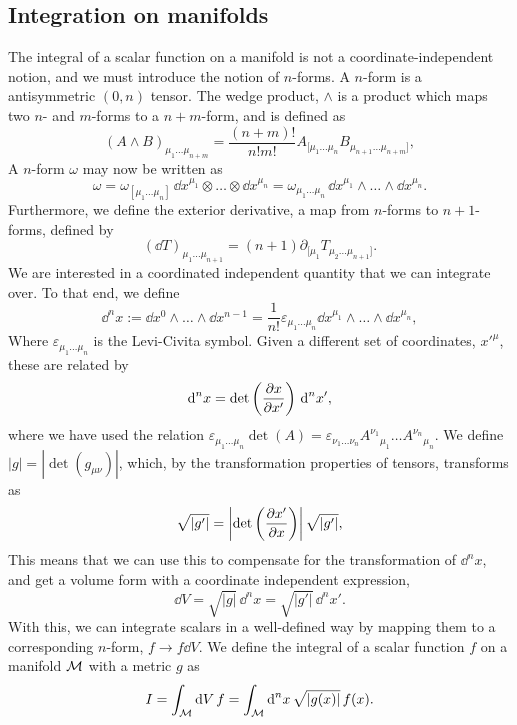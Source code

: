 \subsection{Integration on manifolds}
\label{subsection: integration on manifolds}

The integral of a scalar function on a manifold is not a coordinate-independent notion, and we must introduce the notion of $n$-forms.
A $n$-form is a antisymmetric $(0, n)$ tensor.
The wedge product, $\wedge$ is a product which maps two $n$- and $m$-forms to a $n+m$-form, and is defined as
%
\begin{equation}
    (A\wedge B)_{\mu_1\dots\mu_{n+m}} = \frac{(n + m)!}{n! m!} A_{[\mu_1\dots\mu_n}B_{\mu_{n+1}\dots\mu_{n+m}]},
\end{equation}
%
A $n$-form $\omega$ may now be written as
%
\begin{equation}
    \omega 
    = \omega_{[\mu_1 \dots \mu_n]} \, \dd x^{\mu_1} \otimes \dots \otimes \dd x^{\mu_n}
    = \omega_{\mu_1 \dots \mu_n} \, \dd x^{\mu_1} \wedge \dots \wedge \dd x^{\mu_n}.
\end{equation}
% 
Furthermore, we define the exterior derivative, a map from $n$-forms to $n+1$-forms, defined by
%
\begin{equation}
    (\dd T)_{\mu_1 \dots \mu_{n+1}} = (n+1) \partial_{[\mu_1} T_{\mu_2\dots\mu_{n+1}]}.
\end{equation}
%
We are interested in a coordinated independent quantity that we can integrate over.
To that end, we define
%
\begin{equation}
    \dd^n x := \dd x^0 \wedge \dots \wedge \dd x^{n-1}
    = \frac{1}{n!} \varepsilon_{\mu_1 \dots \mu_n}  
    \dd x^{\mu_1} \wedge \dots \wedge \dd x^{\mu_n},
\end{equation}
%
Where $\varepsilon_{\mu_1 \dots \mu_n}$ is the Levi-Civita symbol.
Given a different set of coordinates, $x'^\mu$, these are related by
%
\begin{equation}
    \text{d}^n x = \det\left( \pdv{x}{x'} \right) \, \text{d}^n x',
\end{equation}
%
where we have used the relation $\varepsilon_{\mu_1 \dots \mu_n}  \det(A) = \varepsilon_{\nu_1 \dots \nu_n} A^{\nu_1}{}_{\mu_1} \dots A^{\nu_n}{}_{\mu_n}$.  
We define $|g| = |\det(g_{\mu \nu })|$, which, by the transformation properties of tensors, transforms as
%
\begin{equation}
    \sqrt{|g'|} = \left| \det\left(\pdv{x'}{x} \right) \right| \sqrt{|g'|},
\end{equation}
%
This means that we can use this to compensate for the transformation of $\dd^n x$, and get a volume form with a coordinate independent expression,
%
\begin{equation}
    \dd V = \sqrt{|g|} \, \dd^n x = \sqrt{|g'|} \, \dd^n x'.
\end{equation}
%
With this, we can integrate scalars in a well-defined way by mapping them to a corresponding $n$-form, $f \rightarrow f \dd V$.
We define the integral of a scalar function $f$ on a manifold $\mathcal{M}$ with a metric $g$ as
%
\begin{equation}
    I = \int_{\mathcal{M}} \text{d} V \, f =  \int_{\mathcal{M}} \text{d}^n x \, \sqrt{|g(x)|} \, f(x).  
\end{equation}


